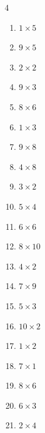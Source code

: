 \begin{multicols}{4}
\begin{enumerate}
  \item $1\times 5$
        \phantom{$=5$}

  \item $9\times 5$
        \phantom{$=45$}

  \item $2\times 2$
        \phantom{$=4$}

  \item $9\times 3$
        \phantom{$=27$}

  \item $8\times 6$
        \phantom{$=48$}

  \item $1\times 3$
        \phantom{$=3$}

  \item $9\times 8$
        \phantom{$=72$}

  \item $4\times 8$
        \phantom{$=32$}

  \item $3\times 2$
        \phantom{$=6$}

  \item $5\times 4$
        \phantom{$=20$}

\columnbreak %

  \item $6\times 6$
        \phantom{$=36$}

  \item $8\times 10$
        \phantom{$=80$}

  \item $4\times 2$
        \phantom{$=8$}

  \item $7\times 9$
        \phantom{$=63$}

  \item $5\times 3$
        \phantom{$=15$}

  \item $10\times 2$
        \phantom{$=20$}

  \item $1\times 2$
        \phantom{$=2$}

  \item $7\times 1$
        \phantom{$=7$}

  \item $8\times 6$
        \phantom{$=48$}

  \item $6\times 3$
        \phantom{$=18$}

  \item $2\times 4$
        \phantom{$=8$}


\end{enumerate}
\end{multicols}
